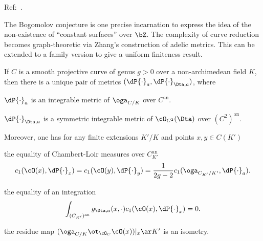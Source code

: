 \documentclass[a4paper, twoside]{article}
\begin{document}
\confighead{}{}{}


Ref:~\cite{Yuan2021Bigness,Zhang1993}.

The Bogomolov conjecture is one precise incarnation to express the idea of the non-existence of ``constant surfaces'' over $\bZ$. The complexity of curve reduction becomes graph-theoretic via Zhang's construction of adelic metrics. This can be extended to a family version to give a uniform finiteness result.



\begin{thm}
	If $C$ is a smooth projective curve of genus $g>0$ over a non-archimedean field $K$, then there is a unique pair of metrics $(\dP{\cdot}_{a},\dP{\cdot}_{\Dta,a})$, where
	\begin{itm}
		\item $\dP{\cdot}_{a}$ is an integrable metric of $\oga_{C/K}$ over $C^{\mathrm{an}}$.
		\item $\dP{\cdot}_{\Dta,a}$ is a symmetric integrable metric of $\cO_{C^{2}}(\Dta)$ over $(C^{2})^{\mathrm{an}}$.
	\end{itm}
	Moreover, one has for any finite extensions $K'/K$ and points $x,y\in C(K')$
	\begin{itm}
		\item the equality of Chambert-Loir measures over $C_{K'}^{\mathrm{an}}$
		\[
			c_{1}(\cO(x),\dP{\cdot}_{x})=c_{1}(\cO(y),\dP{\cdot}_{y})=\frac{1}{2g-2}c_{1}(\oga_{C_{K'}/K'},\dP{\cdot}_{a}).
		\]
		\item the equality of an integration
		\[
			\int_{(C_{K'})^{\mathrm{an}}}g_{\Dta,a}(x,\cdot)c_{1}(\cO(x),\dP{\cdot}_{x})=0.
		\]
		\item the residue map $(\oga_{C/K}\ot_{\cO_{C}}\cO(x))|_{x}\ar K'$ is an isometry.
	\end{itm}
\end{thm}
\end{document}
